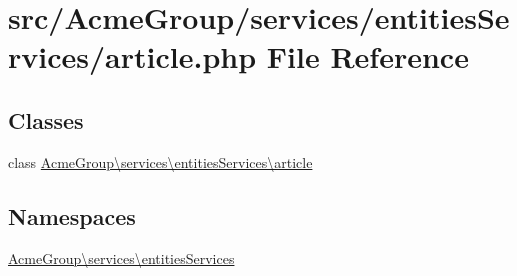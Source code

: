 \hypertarget{services_2entities_services_2article_8php}{\section{src/\+Acme\+Group/services/entities\+Services/article.php File Reference}
\label{services_2entities_services_2article_8php}
}
\subsection*{Classes}
\begin{DoxyCompactItemize}
\item 
class \hyperlink{class_acme_group_1_1services_1_1entities_services_1_1article}{Acme\+Group\textbackslash{}services\textbackslash{}entities\+Services\textbackslash{}article}
\end{DoxyCompactItemize}
\subsection*{Namespaces}
\begin{DoxyCompactItemize}
\item 
 \hyperlink{namespace_acme_group_1_1services_1_1entities_services}{Acme\+Group\textbackslash{}services\textbackslash{}entities\+Services}
\end{DoxyCompactItemize}

